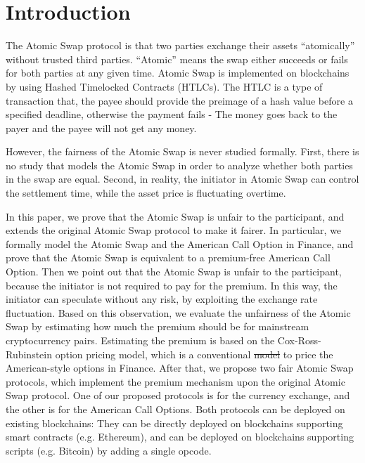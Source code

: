 \section{Introduction}
\label{sec:intro}

The Atomic Swap protocol is that two parties exchange their assets ``atomically'' without trusted third parties.
``Atomic'' means the swap either succeeds or fails for both parties at any given time. 
Atomic Swap is implemented on blockchains by using Hashed Timelocked Contracts (HTLCs).
The HTLC is a type of transaction that, the payee should provide the preimage of a hash value before a specified deadline, otherwise the payment fails - The money goes back to the payer and the payee will not get any money.

However, the fairness of the Atomic Swap is never studied formally.
First, there is no study that models the Atomic Swap in order to analyze whether both parties in the swap are equal.
Second, in reality,  the initiator in Atomic Swap can control the settlement time, while the asset price is fluctuating overtime. 

In this paper, we prove that the Atomic Swap is unfair to the participant, and extends the original Atomic Swap protocol to make it fairer.
In particular, we formally model the Atomic Swap and the American Call Option in Finance,
and prove that the Atomic Swap is equivalent to a premium-free American Call Option.
Then we point out that the Atomic Swap is unfair to the participant, because the initiator is not required to pay for the premium.
In this way, the initiator can speculate without any risk, by exploiting the exchange rate fluctuation.
Based on this observation, we evaluate the unfairness of the Atomic Swap by estimating how much the premium should be for mainstream cryptocurrency pairs.
Estimating the premium is based on the Cox-Ross-Rubinstein option pricing model, which is a conventional \sout{model}  to price the American-style options in Finance.
After that, we propose two fair Atomic Swap protocols, which implement the premium mechanism upon the original Atomic Swap protocol.
One of our proposed protocols is for the currency exchange, and the other is for the American Call Options.
Both protocols can be deployed on existing blockchains:
They can be directly deployed on blockchains supporting smart contracts (e.g. Ethereum),
and can be deployed on blockchains supporting scripts (e.g. Bitcoin) by adding a single opcode.

